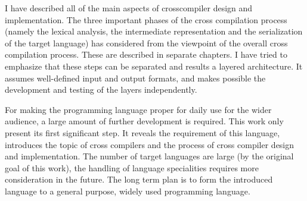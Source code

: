 I have described all of the main aspects of crosscompiler design and implementation. The three important phases of the cross compilation process (namely the lexical analysis, the intermediate representation and the serialization of the target language) has considered from the viewpoint of the overall cross compilation process. These are described in separate chapters. I have tried to emphasize that these steps can be separated and results a layered architecture. It assumes well-defined input and output formats, and makes possible the development and testing of the layers independently.

For making the programming language proper for daily use for the wider audience, a large amount of further development is required. This work only present its first significant step. It reveals the requirement of this language, introduces the topic of cross compilers and the process of cross compiler design and implementation. The number of target languages are large (by the original goal of this work), the handling of language specialities requires more consideration in the future. The long term plan is to form the introduced language to a general purpose, widely used programming language.
